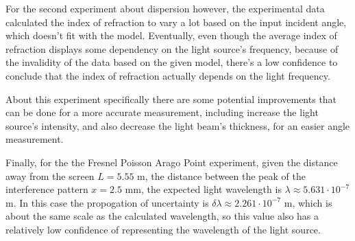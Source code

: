 \documentclass{article}
\begin{document}
\hfil

For the second experiment about dispersion however, the experimental data calculated the index of refraction to vary a lot based on the input incident angle, which doesn't fit with the model. Eventually, even though the average index of refraction displays some dependency on the light source's frequency, because of the invalidity of the data based on the given model, there's a low confidence to conclude that the index of refraction actually depends on the light frequency. 

About this experiment specifically there are some potential improvements that can be done for a more accurate measurement, including increase the light source's intensity, and also decrease the light beam's thickness, for an easier angle measurement.

\hfil

Finally, for the the Fresnel Poisson Arago Point experiment, given the distance away from the screen $L=5.55$ m, the distance between the peak of the interference pattern $x=2.5$ mm, the expected light wavelength is $\lambda \approx 5.631\cdot 10^{-7}$ m. In this case the propogation of uncertainty is $\delta\lambda\approx 2.261\cdot 10^{-7}$ m, which is about the same scale as the calculated wavelength, so this value also has a relatively low confidence of representing the wavelength of the light source.
\end{document}
